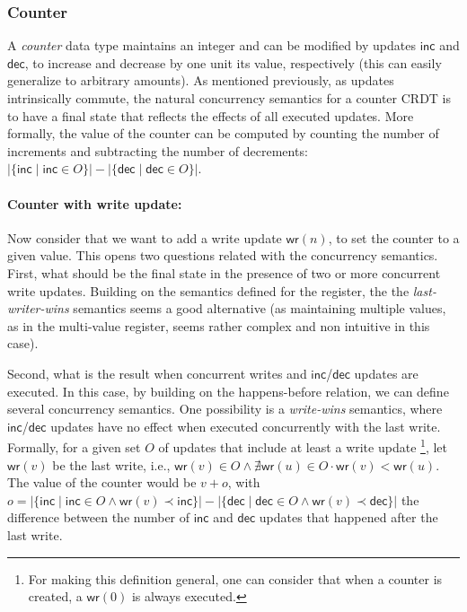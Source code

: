 \documentclass[11pt,a4paper]{article}
\def\land{\mathrel{\wedge}}
\begin{document}
\subsubsection{Counter}
A \emph{counter} data type maintains an integer and can be modified 
by updates $\mathsf{inc}$ and $\mathsf{dec}$, 
to increase and decrease by one unit its value, respectively
(this can easily generalize to arbitrary amounts).
As mentioned previously, as updates intrinsically commute, the natural
concurrency semantics for a counter CRDT \cite{Shapiro11Conflict} is to have a final state that 
reflects the effects of all executed updates. 
More formally, the value of the counter can be computed by 
counting the number of increments and subtracting the number of decrements: 
$\left| \{ \mathsf{inc} \mid \mathsf{inc} \in O \} \right| - \left| \{ \mathsf{dec} \mid \mathsf{dec} \in O \} \right|$. 

\paragraph{Counter with write update:}
Now consider that we want to add a write update $\mathsf{wr}(n)$, to set
the counter to a given value. 
This opens two questions related with the concurrency semantics.
First, what should be the final state in the presence of 
two or more concurrent write updates. 
Building on the semantics defined for the register, the 
the \emph{last-writer-wins} semantics seems a good alternative 
(as maintaining multiple values, as in the multi-value register, 
seems rather complex and non intuitive in this case).

Second, what is the result when concurrent writes and $\mathsf{inc}$/$\mathsf{dec}$ updates 
are executed. 
In this case, by building on the happens-before relation, we can 
define several concurrency semantics.  
One possibility is a \emph{write-wins} semantics, where $\mathsf{inc}$/$\mathsf{dec}$ 
updates have no effect when executed concurrently with the 
last write.
Formally, for a given set $O$ of updates that include at least a write update \footnote{For making this definition general, one can consider that when a counter is created, a $\mathsf{wr}(0)$ is always executed.},
let $\mathsf{wr}(v)$ be the last write, i.e., $\mathsf{wr}(v) \in O \land \nexists \mathsf{wr}(u) \in O \cdot \mathsf{wr}(v) < \mathsf{wr}(u)$. 
The value of the counter would be
$v + o$, 
with $o = \left| \{ \mathsf{inc} \mid \mathsf{inc} \in O \wedge \mathsf{wr}(v) \prec \mathsf{inc}\} \right| - \left| \{ \mathsf{dec} \mid \mathsf{dec} \in O \wedge \mathsf{wr}(v) \prec \mathsf{dec}\} \right|$
the difference between the number of $\mathsf{inc}$ and $\mathsf{dec}$ updates that happened after the last write.
\end{document}
